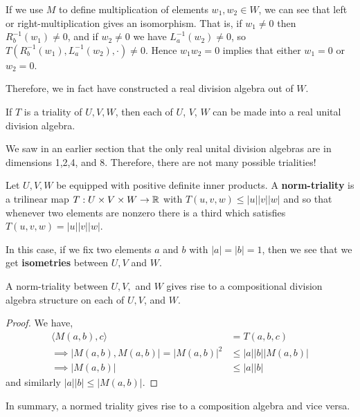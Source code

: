 \begin{remark*}
    If we use $M$ to define multiplication of elements $w_1,w_2\in W$, we can see that left or right-multiplication gives an isomorphism. That is, if $w_1\neq 0$ then $R_b^{-1}(w_1)\neq 0$, and if $w_2\neq 0$ we have $L_a^{-1}(w_2)\neq 0$, so $T(R_b^{-1}(w_1),L_a^{-1}(w_2),\cdot)\neq 0$. Hence $w_1w_2=0$ implies that either $w_1=0$ or $w_2=0$.

    Therefore, we in fact have constructed a real division algebra out of $W$.
\end{remark*}
\begin{cor}
    If $T$ is a triality of $U,V,W$, then each of $U$, $V$, $W$ can be made into a real unital division algebra.
\end{cor}
\begin{remark*}
    We saw in an earlier section that the only real unital division algebras are in dimensions 1,2,4, and 8. Therefore, there are not many possible trialities!
\end{remark*}
\begin{defn}
Let $U,V,W$ be equipped with positive definite inner products. A \textbf{norm-triality} is a trilinear map $T:U\times V\times W \to \operatorname{\mathbb{R}}$ with $T(u,v,w)\leq |u||v||w|$ and so that whenever two elements are nonzero there is a third which satisfies $T(u,v,w) = |u||v||w|$.
\end{defn}
\begin{remark*}
    In this case, if we fix two elements $a$ and $b$ with $|a|=|b|=1$, then we see that we get \textbf{isometries} between $U,V$ and $W$.
\end{remark*}
\begin{cor}
    A norm-triality between $U,V,$ and $W$ gives rise to a compositional division algebra structure on each of $U,V$, and $W$.
\end{cor}
\begin{proof}
    We have,
    \begin{align*}
        \langle M(a,b),c\rangle &= T(a,b,c)\\
        \implies |M(a,b),M(a,b)| = |M(a,b)|^2 &\leq |a||b||M(a,b)|\\
        \implies |M(a,b)|&\leq |a||b|
    \end{align*}
    and similarly $|a||b| \leq |M(a,b)|$.
\end{proof}
In summary, a normed triality gives rise to a composition algebra and vice versa.



